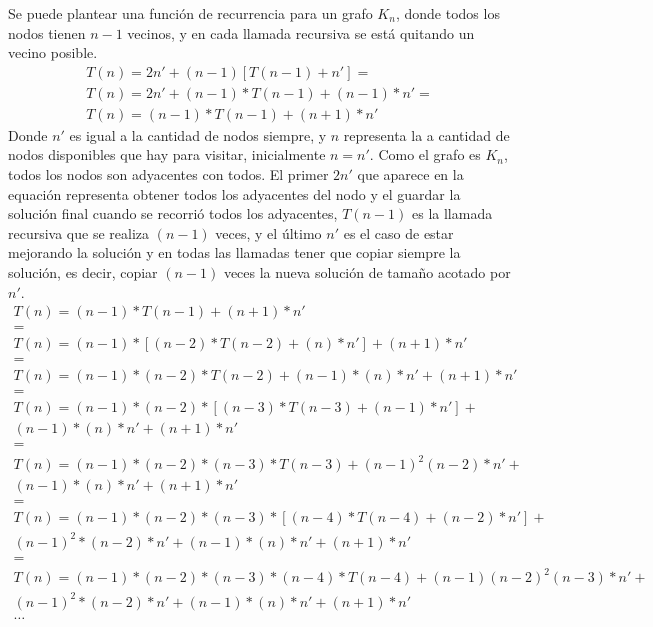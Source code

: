 Se puede plantear una funci\'on de recurrencia para un grafo $K_n$, donde todos los nodos tienen $n - 1$ vecinos, y en cada llamada recursiva se est\'a quitando un vecino posible.
\begin{equation*}
\begin{split}
T(n) = 2n' + (n-1)[T(n-1) + n'] = \\
T(n) = 2n' + (n-1)*T(n-1) + (n-1)*n' = \\
T(n) = (n-1)*T(n-1) + (n+1)*n'
\end{split}
\end{equation*}
Donde $n'$ es igual a la cantidad de nodos siempre, y $n$ representa la a cantidad de nodos disponibles que hay para visitar, inicialmente $n = n'$. Como el grafo es $K_n$, todos los nodos son adyacentes con todos.
El primer $2n'$ que aparece en la equaci\'on representa obtener todos los adyacentes del nodo y el guardar la soluci\'on final cuando se recorri\'o todos los adyacentes, $T(n-1)$ es la llamada recursiva que se realiza $(n-1)$ veces, y el \'ultimo $n'$ es el caso de estar mejorando la soluci\'on y en todas las llamadas tener que copiar siempre la soluci\'on, es decir, copiar $(n-1)$ veces la nueva soluci\'on de tama\~no acotado por $n'$.
\begin{equation*}
\begin{split}
T(n) = (n-1)*T(n-1) + (n+1)*n' \\
= \\
T(n) = (n-1)*[(n-2)*T(n-2) + (n)*n'] + (n+1)*n' \\
= \\
T(n) = (n-1)*(n-2)*T(n-2) + (n-1)*(n)*n'+ (n+1)*n' \\
= \\
T(n) = (n-1)*(n-2)*[(n-3)*T(n-3) + (n-1)*n'] + \\
(n-1)*(n)*n'+ (n+1)*n' \\
= \\
T(n) = (n-1)*(n-2)*(n-3)*T(n-3) + (n-1)^2(n-2)*n' + \\
(n-1)*(n)*n' + (n+1)*n' \\
= \\
T(n) = (n-1)*(n-2)*(n-3)*[(n-4)*T(n-4) + (n-2)*n'] + \\
(n-1)^2*(n-2)*n' + (n-1)*(n)*n' + (n+1)*n' \\
= \\
T(n) = (n-1)*(n-2)*(n-3)*(n-4)*T(n-4) + (n-1)(n-2)^2(n-3)*n' + \\
(n-1)^2*(n-2)*n' + (n-1)*(n)*n' + (n+1)*n' \\
\dots
\end{split}
\end{equation*}
